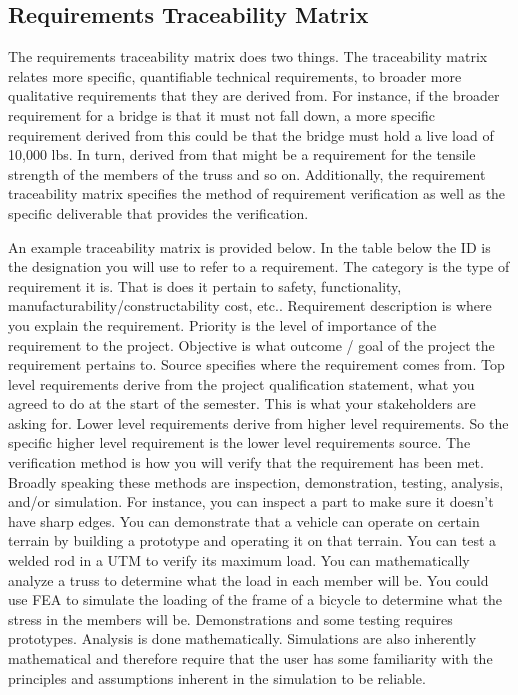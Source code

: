 \documentclass[fleqn,10pt]{project}
\begin{document}
\begin{landscape}
\subsection{Requirements Traceability Matrix}
The requirements traceability matrix does two things. The traceability matrix relates more 
specific, quantifiable technical requirements, to broader more qualitative requirements
that they are derived from.  For instance, if the broader requirement for a bridge is
that it must not fall down, a more specific requirement derived from this could be 
that the bridge must hold a live load of 10,000 lbs.  In turn, derived from that might be a
requirement for the tensile strength of the members of the truss and so on.  Additionally, 
the requirement traceability matrix specifies the method of requirement verification
as well as the specific deliverable that provides the verification. 

An example traceability matrix is provided below.  In the table below the ID is the 
designation you will use to refer to a requirement.  The category is the type of 
requirement it is. That is does it pertain to safety, functionality, manufacturability/constructability
cost, etc.. Requirement description is where you explain the requirement.  Priority is 
the level of importance of the requirement to the project.  Objective is what outcome / goal of 
the project the requirement pertains to.  Source specifies where the requirement comes from. Top
level requirements derive from the project qualification statement, what you agreed to do
at the start of the semester.  This is what your stakeholders are asking for.
Lower level requirements derive from higher level requirements. So the specific higher level requirement
is the  lower level requirements source.  The verification method is how you will verify that the 
requirement has been met.  Broadly speaking these methods are inspection, demonstration, testing, analysis,
and/or simulation.  For instance, you can inspect a part to make sure it doesn't have sharp edges.  You
can demonstrate that a vehicle can operate on certain terrain by building a prototype and operating it on
that terrain. You can test a welded rod in a UTM to verify its maximum load.  You can mathematically analyze
a truss to determine what the load in each member will be.  You could use FEA to simulate the loading of 
the frame of a bicycle to determine what the stress in the members will be.  Demonstrations and some
testing requires prototypes.  Analysis is done mathematically.  Simulations are also inherently
mathematical and therefore require that the user has some familiarity with the principles and assumptions
inherent in the simulation to be reliable. 


\end{landscape}
\end{document}
